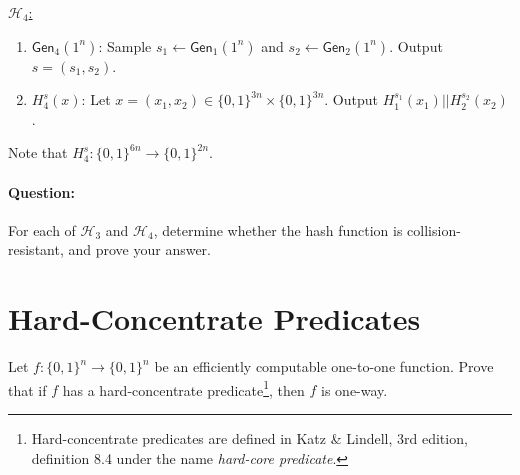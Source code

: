 \documentclass[11pt]{article}
\numberwithin{equation}{section}
\newcommand{\Gen}{\mathsf{Gen}}
\newcommand{\bin}{\{0,1\}}
\newcommand{\bit}{\bin}
\begin{document}
\noindent\underline{$\mathcal{H}_4$:}
\begin{enumerate}
    \item $\Gen_4(1^n)$: Sample $s_1 \leftarrow \Gen_1(1^n)$ and $s_2 \leftarrow \Gen_2(1^n)$. Output $s=(s_1, s_2)$.
    \item $H_4^s(x)$: Let $x = (x_1, x_2) \in \bit^{3n} \times \bit^{3n}$. Output $H_1^{s_1}(x_1) || H_2^{s_2}(x_2)$.
\end{enumerate}
Note that $H_4^s: \bit^{6n} \to \bit^{2n}$.

\paragraph{Question:} For each of $\mathcal{H}_3$ and $\mathcal{H}_4$, determine whether the hash function is collision-resistant, and prove your answer.

\pagebreak


\section{Hard-Concentrate Predicates}
Let $f:\bit^n \to \bit^n$ be an efficiently computable one-to-one function. Prove that if $f$ has a hard-concentrate predicate\footnote{Hard-concentrate predicates are defined in Katz \& Lindell, 3rd edition, definition 8.4 under the name \emph{hard-core predicate}.}, then $f$ is one-way.

\pagebreak
\end{document}
